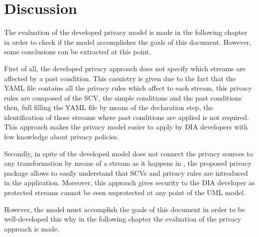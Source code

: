 

\section{Discussion}

The evaluation of the developed privacy model is made in the following chapter in order to check if the model accomplishes the goals of this document. However, some conclusions can be extracted at this point.

First of all, the developed privacy approach does not specify which streams are affected by a past condition. This casuistry is given due to the fact that the YAML file contains all the privacy rules which affect to each stream, this privacy rules are composed of the SCV, the simple conditions and the past conditions then, full filling the YAML file by means of the declaration step, the identification of those streams where past conditions are applied is not required. This approach makes the privacy model easier to apply by DIA developers with few knowledge about privacy policies.

Secondly, in spite of the developed model does not connect the privacy sources to any transformation by means of a stream as it happens in \cite{privacypoliciesarticle}, the proposed privacy package allows to easily understand that SCVs and privacy rules are introduced in the application. Moreover, this approach gives security to the DIA developer as protected streams cannot be seen unprotected at any point of the UML model.

However, the model must accomplish the goals of this document in order to be well-developed this why in the following chapter the evaluation of the privacy approach is made.












